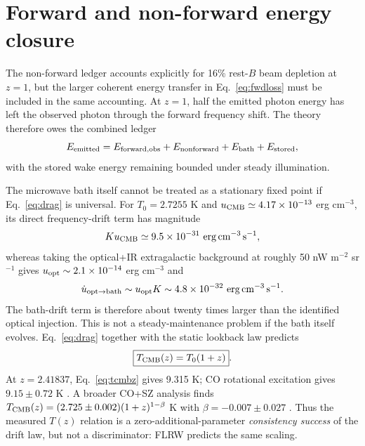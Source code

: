 \documentclass[11pt]{article}
\begin{document}
\section{Forward and non-forward energy closure}
\label{sec:energy}
The non-forward ledger accounts explicitly for 16\% rest-$B$ beam depletion at $z=1$, but the larger coherent energy transfer in Eq.~\eqref{eq:fwdloss} must be included in the same accounting. At $z=1$, half the emitted photon energy has left the observed photon through the forward frequency shift. The theory therefore owes the combined ledger
\begin{equation}
 E_{\rm emitted}=E_{\rm forward,obs}+E_{\rm nonforward}+E_{\rm bath}+E_{\rm stored},
 \label{eq:ledger}
\end{equation}
with the stored wake energy remaining bounded under steady illumination.

The microwave bath itself cannot be treated as a stationary fixed point if Eq.~\eqref{eq:drag} is universal. For $T_0=2.7255$ K and $u_{\rm CMB}\simeq4.17\times10^{-13}$ erg cm$^{-3}$, its direct frequency-drift term has magnitude
\begin{equation}
 K u_{\rm CMB}\simeq9.5\times10^{-31}\ {\rm erg\,cm^{-3}\,s^{-1}},
 \label{eq:cmbdriftenergy}
\end{equation}
whereas taking the optical+IR extragalactic background at roughly 50 nW m$^{-2}$ sr$^{-1}$ gives $u_{\rm opt}\sim2.1\times10^{-14}$ erg cm$^{-3}$ and
\begin{equation}
 \dot u_{\rm opt\rightarrow bath}\sim u_{\rm opt}K\sim4.8\times10^{-32}\ {\rm erg\,cm^{-3}\,s^{-1}}.
 \label{eq:optinject}
\end{equation}
The bath-drift term is therefore about twenty times larger than the identified optical injection. This is not a steady-maintenance problem if the bath itself evolves. Eq.~\eqref{eq:drag} together with the static lookback law predicts
\begin{equation}
 \boxed{T_{\rm CMB}(z)=T_0(1+z)}.
 \label{eq:tcmbz}
\end{equation}
At $z=2.41837$, Eq.~\eqref{eq:tcmbz} gives 9.315 K; CO rotational excitation gives $9.15\pm0.72$ K \citep{Srianand2008}. A broader CO+SZ analysis finds $T_{\rm CMB}(z)=(2.725\pm0.002)(1+z)^{1-\beta}$ K with $\beta=-0.007\pm0.027$ \citep{Noterdaeme2011}. Thus the measured $T(z)$ relation is a zero-additional-parameter \emph{consistency success} of the drift law, but not a discriminator: FLRW predicts the same scaling.
\end{document}
